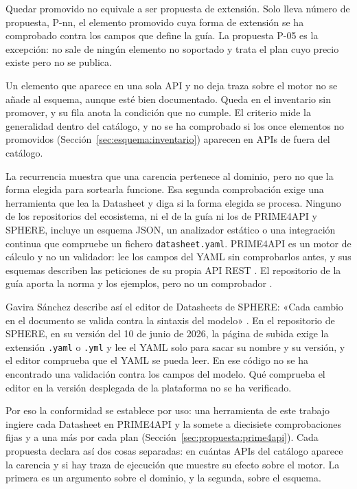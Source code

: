 Quedar promovido no equivale a ser propuesta de extensión.
Solo lleva número de propuesta, P-nn, el elemento promovido cuya forma de extensión se ha comprobado contra los campos que define la guía.
La propuesta P-05 es la excepción: no sale de ningún elemento no soportado y trata el plan cuyo precio existe pero no se publica.

Un elemento que aparece en una sola API y no deja traza sobre el motor no se añade al esquema, aunque esté bien documentado.
Queda en el inventario sin promover, y su fila anota la condición que no cumple.
El criterio mide la generalidad dentro del catálogo, y no se ha comprobado si los once elementos no promovidos (Sección~\ref{sec:esquema:inventario}) aparecen en APIs de fuera del catálogo.

La recurrencia muestra que una carencia pertenece al dominio, pero no que la forma elegida para sortearla funcione.
Esa segunda comprobación exige una herramienta que lea la Datasheet y diga si la forma elegida se procesa.
Ninguno de los repositorios del ecosistema, ni el de la guía ni los de PRIME4API y SPHERE, incluye un esquema JSON, un analizador estático o una integración continua que compruebe un fichero \texttt{datasheet.yaml}.
PRIME4API es un motor de cálculo y no un validador: lee los campos del YAML sin comprobarlos antes, y sus esquemas describen las peticiones de su propia API REST \citep{prime4apirepo}.
El repositorio de la guía aporta la norma y los ejemplos, pero no un comprobador \citep{apisconsumptionmodel}.

Gavira Sánchez describe así el editor de Datasheets de SPHERE: «Cada cambio en el documento se valida contra la sintaxis del modelo» \citep{gavira2026tfm}.
En el repositorio de SPHERE, en su versión del 10 de junio de 2026, la página de subida exige la extensión \texttt{.yaml} o \texttt{.yml} y lee el YAML solo para sacar su nombre y su versión, y el editor comprueba que el YAML se pueda leer.
En ese código no se ha encontrado una validación contra los campos del modelo.
Qué comprueba el editor en la versión desplegada de la plataforma \citep{sphere} no se ha verificado.

Por eso la conformidad se establece por uso: una herramienta de este trabajo ingiere cada Datasheet en PRIME4API y la somete a diecisiete comprobaciones fijas y a una más por cada plan (Sección~\ref{sec:propuesta:prime4api}).
Cada propuesta declara así dos cosas separadas: en cuántas APIs del catálogo aparece la carencia y si hay traza de ejecución que muestre su efecto sobre el motor.
La primera es un argumento sobre el dominio, y la segunda, sobre el esquema.

